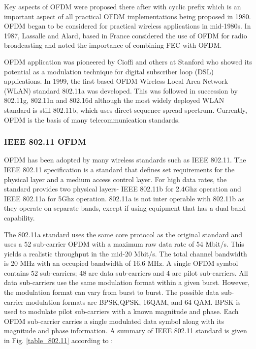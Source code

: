 Key aspects of \gls{OFDM} were proposed there after with cyclic prefix which is an important aspect of all practical \gls{OFDM} implementations being proposed in 1980. \gls{OFDM} began to be considered for practical wireless applications in mid-1980s. In 1987, Lassalle and
 Alard, based in France considered the use of \gls{OFDM} for
radio broadcasting and noted the importance of combining
\gls{FEC} with \gls{OFDM}. 

\gls{OFDM} application was pioneered by Cioffi and others at Stanford who showed its
potential as a modulation technique for digital subscriber
loop (DSL) applications. In 1999, the first based \gls{OFDM} Wireless Local Area Network (WLAN) standard 802.11a was developed. This was followed in succession
by 802.11g, 802.11n and 802.16d although the most widely deployed WLAN
standard is still 802.11b, which uses direct sequence spread spectrum. Currently, \gls{OFDM} is the basis of many telecommunication standards.

\subsubsection{IEEE 802.11 OFDM}
\gls{OFDM} has been adopted by many wireless standards such as IEEE  802.11. The IEEE 802.11 specification is a standard that defines set requirements for the physical layer and a medium access control layer. For high data rates, the standard provides two physical layers- IEEE 802.11b for 2.4Ghz operation and IEEE 802.11a for 5Ghz operation\cite{802.11}. 802.11a is not inter operable with 802.11b as they operate on separate bands, except if using equipment that has a dual band capability.

 The 802.11a standard uses the same core protocol as the original standard and uses a 52 sub-carrier \gls{OFDM} with a maximum raw data rate of 54 Mbit/s. This yields a realistic throughput in the mid-20 Mbit/s. The total channel bandwidth is 20 MHz with an occupied bandwidth of 16.6 MHz. A single \gls{OFDM} symbol contains 52 sub-carriers; 48 are data sub-carriers and 4 are pilot sub-carriers. All data sub-carriers use the same modulation format within a given burst. However, the modulation format can vary from burst to burst. The possible data sub-carrier modulation formats are \gls{BPSK},\gls{QPSK}, 16\gls {QAM}, and 64 \gls{QAM}. \gls{BPSK} is used to modulate pilot sub-carriers with a known magnitude and phase. Each \gls{OFDM} sub-carrier carries a single modulated data symbol along with its magnitude and phase information. A summary of IEEE 802.11 standard is given in Fig. \ref{table_802.11} according to \cite{IEEE}:
 

